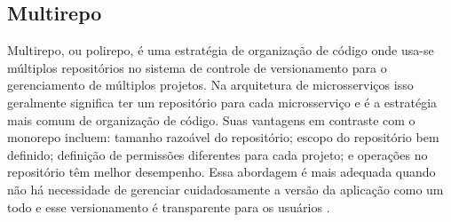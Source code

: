 
\subsection{Multirepo}
Multirepo, ou polirepo, é uma estratégia de organização de código onde usa-se múltiplos repositórios no sistema de controle de versionamento para o gerenciamento de múltiplos projetos. Na arquitetura de microsserviços isso geralmente significa ter um repositório para cada microsserviço e é a estratégia mais comum de organização de código. Suas vantagens em contraste com o monorepo incluem: tamanho razoável do repositório; escopo do repositório bem definido; definição de permissões diferentes para cada projeto; e operações no repositório têm melhor desempenho. Essa abordagem é mais adequada quando não há necessidade de gerenciar cuidadosamente a versão da aplicação como um todo e esse versionamento é transparente para os usuários \cite{monorepo-polirepo-semaphoreci}.




